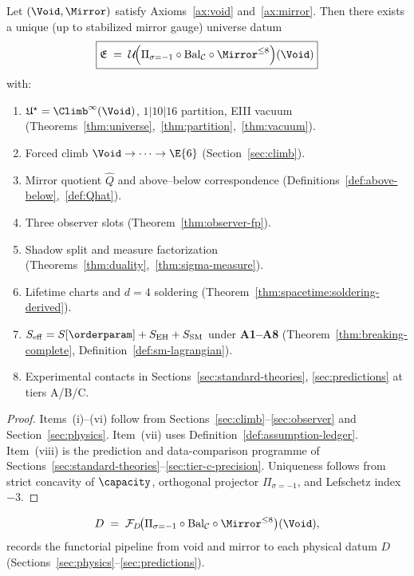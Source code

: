 \begin{theorem}\label{thm:universe-summary}
Let $(\Void,\Mirror)$ satisfy Axioms~\ref{ax:void} and~\ref{ax:mirror}. Then
there exists a unique (up to stabilized mirror gauge) universe datum
\begin{equation}\label{eq:universe-summary}
  \boxed{%
  \mathfrak{E}
  \;=\;
  \mathcal{U}\!\Bigl(
    \Pi_{\sigma=-1}\circ\mathrm{Bal}_{\mathcal{C}}\circ\Mirror^{\leq 8}
  \Bigr)(\Void)}
\end{equation}
with:
\begin{enumerate}[label=(\roman*),leftmargin=*]
  \item $\mathfrak{U}^\star=\Climb^\infty(\Void)$, $1|10|16$ partition, EIII
    vacuum (Theorems~\ref{thm:universe},~\ref{thm:partition},~\ref{thm:vacuum}).
  \item Forced climb $\Void\to\cdots\to\E{6}$ (Section~\ref{sec:climb}).
  \item Mirror quotient $\hat Q$ and above--below correspondence
    (Definitions~\ref{def:above-below},~\ref{def:Qhat}).
  \item Three observer slots (Theorem~\ref{thm:observer-fp}).
  \item Shadow split and measure factorization
    (Theorems~\ref{thm:duality},~\ref{thm:sigma-measure}).
  \item Lifetime charts and $d=4$ soldering
    (Theorem~\ref{thm:spacetime:soldering-derived}).
  \item $S_{\mathrm{eff}}=S[\orderparam]+S_{\mathrm{EH}}+S_{\mathrm{SM}}$
    under \textbf{A1--A8}
    (Theorem~\ref{thm:breaking-complete}, Definition~\ref{def:sm-lagrangian}).
  \item Experimental contacts in Sections~\ref{sec:standard-theories},
    \ref{sec:predictions} at tiers A/B/C.
\end{enumerate}
\end{theorem}

\begin{proof}
Items~(i)--(vi) follow from Sections~\ref{sec:climb}--\ref{sec:observer} and
Section~\ref{sec:physics}. Item~(vii) uses Definition~\ref{def:assumption-ledger}.
Item~(viii) is the prediction and data-comparison programme of
Sections~\ref{sec:standard-theories}--\ref{sec:tier-c-precision}.
Uniqueness follows from strict concavity of $\capacity$, orthogonal projector
$\Pi_{\sigma=-1}$, and Lefschetz index $-3$.
\end{proof}

\begin{equation}\label{eq:master-pipeline}
  D
  \;=\;
  \mathcal{F}_D\!\bigl(
    \Pi_{\sigma=-1}\circ\mathrm{Bal}_{\mathcal{C}}\circ\Mirror^{\leq 8}
  \bigr)(\Void),
\end{equation}
records the functorial pipeline from void and mirror to each physical datum
$D$ (Sections~\ref{sec:physics}--\ref{sec:predictions}).


